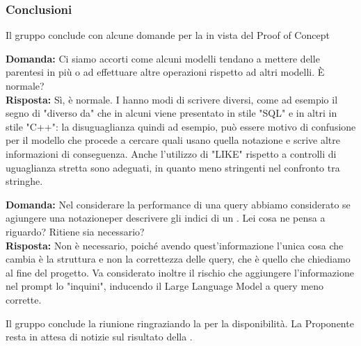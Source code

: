 \subsubsection{Conclusioni}
\par Il gruppo conclude con alcune domande per la  in vista del Proof of Concept

\par \textbf{Domanda:} Ci siamo accorti come alcuni modelli tendano a mettere delle parentesi in più o ad effettuare altre operazioni rispetto ad altri modelli. È normale? \\
\textbf{Risposta:} Sì, è normale. I  hanno modi di scrivere diversi, come ad esempio il segno di "diverso da" che in alcuni viene presentato in stile "SQL" e in altri in stile "C++": la disuguaglianza quindi ad esempio, può essere motivo di confusione per il modello che procede a cercare quali  usano quella notazione e scrive altre informazioni di conseguenza. Anche l'utilizzo di "LIKE" rispetto a controlli di uguaglianza stretta sono adeguati, in quanto meno stringenti nel confronto tra stringhe.

\par \textbf{Domanda:} Nel considerare la performance di una query abbiamo considerato se agiungere una notazioneper descrivere gli indici di un . Lei cosa ne pensa a riguardo? Ritiene sia necessario? \\
\textbf{Risposta:} Non è necessario, poiché avendo quest'informazione l'unica cosa che cambia è la struttura e non la correttezza delle query, che è quello che chiediamo al fine del progetto. Va considerato inoltre il rischio che aggiungere l'informazione nel prompt lo "inquini", inducendo il Large Language Model a query meno corrette.

\par Il gruppo conclude la riunione ringraziando la  per la disponibilità. La Proponente resta in attesa di notizie sul risultato della \RTB.